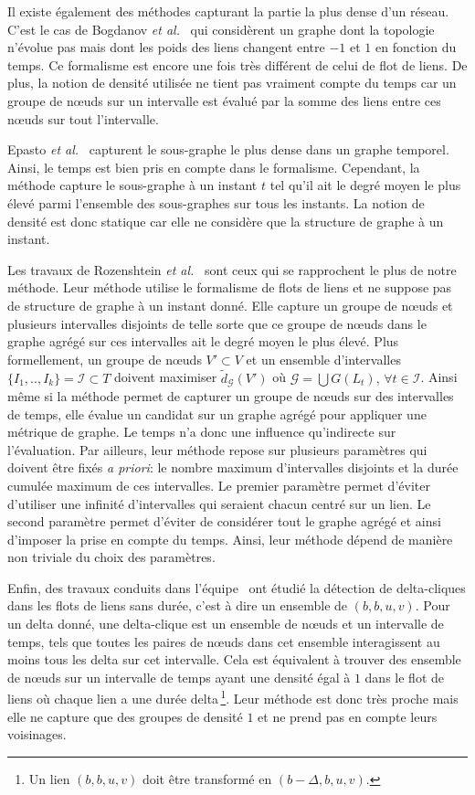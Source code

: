 Il existe également des méthodes capturant la partie la plus dense d'un réseau.
C'est le cas de Bogdanov \emph{et al.}~\cite{Bogdanov2011} qui considèrent  un graphe dont la topologie n'évolue pas mais dont les poids des liens changent entre $-1$ et $1$ en fonction du temps.
Ce formalisme est encore une fois très différent de celui de flot de liens.
De plus, la notion de densité utilisée ne tient pas vraiment compte du temps car un groupe de n\oe{}uds sur un intervalle est évalué par la somme des liens entre ces n\oe{}uds sur tout l'intervalle.


Epasto \emph{et al.}~\cite{Epasto2015} capturent le sous-graphe le plus dense dans un graphe temporel.
Ainsi, le temps est bien pris en compte dans le formalisme.
Cependant, la méthode capture le sous-graphe à un instant $t$ tel qu'il ait le degré moyen le plus élevé parmi l'ensemble des sous-graphes sur tous les instants.
La notion de densité est donc statique car elle ne considère que la structure de graphe à un instant.


Les travaux de Rozenshtein \emph{et al.}~\cite{rozenshtein2014} sont ceux qui se rapprochent le plus de notre méthode.
Leur méthode utilise le formalisme de flots de liens et ne suppose pas de structure de graphe à un instant donné.
Elle capture un groupe de n\oe{}uds et plusieurs intervalles disjoints de telle sorte que ce groupe de n\oe{}uds dans le graphe agrégé sur ces intervalles ait le degré moyen le plus élevé.
Plus formellement, un groupe de n\oe{}uds $V'\subset V$ et un ensemble d'intervalles $\{I_1,..,I_k\} = \mathcal{I} \subset T$ doivent maximiser $\tilde{d}_\mathcal{G}(V')$ où  $\mathcal{G}= \bigcup G(L_t),\,\forall t \in \mathcal{I}$.
Ainsi même si la méthode permet de capturer un groupe de n\oe{}uds sur des intervalles de temps, elle évalue un candidat sur un graphe agrégé pour appliquer une métrique de graphe.
Le temps n'a donc une influence qu'indirecte sur l'évaluation.
Par ailleurs, leur méthode repose sur plusieurs paramètres qui doivent être fixés \emph{a priori}: le nombre maximum d'intervalles disjoints et la durée cumulée maximum de ces intervalles.
Le premier paramètre permet d'éviter d'utiliser une infinité d'intervalles qui seraient chacun centré sur un lien.
Le second paramètre permet d'éviter de considérer tout le graphe agrégé et ainsi d'imposer la prise en compte du temps.
Ainsi, leur méthode dépend de manière non triviale du choix des paramètres.

Enfin, des travaux conduits dans l'équipe~\cite{viard:hal-01208330,Viard2016} ont étudié la détection de delta-cliques dans les flots de liens sans durée, c'est à dire un ensemble de $(b,b,u,v)$.
Pour un delta donné, une delta-clique est un ensemble de n\oe{}uds et un intervalle de temps, tels que toutes les paires de n\oe{}uds dans cet ensemble interagissent au moins tous les delta sur cet intervalle.
Cela est équivalent à trouver des ensemble de n\oe{}uds sur un intervalle de temps ayant une densité égal à $1$ dans le flot de liens où chaque lien a une durée delta\,\footnote{Un lien $(b,b,u,v)$ doit être transformé en $(b-\Delta,b,u,v)$.}.
Leur méthode est donc très proche mais elle ne capture que des groupes de densité $1$ et ne prend pas en compte leurs voisinages.



